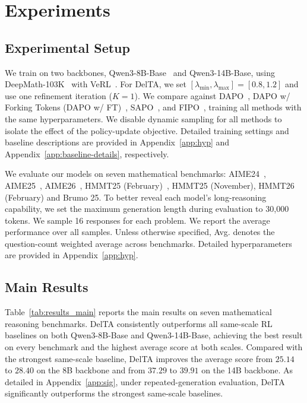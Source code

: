 \documentclass{article} %
\begin{document}
\section{Experiments}
\subsection{Experimental Setup}
\label{sec:exp_s}
We train on two backbones, Qwen3-8B-Base~\citep{yang2025qwen3} and Qwen3-14B-Base, using DeepMath-103K~\citep{he2025deepmath} with VeRL~\citep{sheng2024hybridflow}. For DelTA, we set \([\lambda_{\min},\lambda_{\max}]=[0.8,1.2]\) and use one refinement iteration (\(K=1\)). We compare against DAPO~\citep{yu2025dapo}, DAPO w/ Forking Tokens (DAPO w/ FT)~\citep{wang2025beyond}, SAPO~\citep{gao2025soft}, and FIPO~\citep{ma2026fipo}, training all methods with the same hyperparameters. We disable dynamic sampling for all methods to isolate the effect of the policy-update objective. Detailed training settings and baseline descriptions are provided in Appendix~\ref{app:hyp} and Appendix~\ref{app:baseline-details}, respectively.

We evaluate our models on seven mathematical benchmarks: AIME24~\citep{aime24}, AIME25~\citep{aime25}, AIME26~\citep{aime26}, HMMT25 (February)~\citep{balunovic_srimatharena_2025}, HMMT25 (November), HMMT26 (February) and Brumo 25.  To better reveal each model's long-reasoning capability, we set the maximum generation length during evaluation to 30{,}000 tokens. We sample 16 responses for each problem. We report the average performance over all samples. Unless otherwise specified, Avg. denotes the question-count weighted average across benchmarks. Detailed hyperparameters are provided in Appendix~\ref{app:hyp}.



\subsection{Main Results}
\label{sec:main-results}

Table~\ref{tab:results_main} reports the main results on seven mathematical
reasoning benchmarks. DelTA consistently outperforms all same-scale RL baselines
on both Qwen3-8B-Base and Qwen3-14B-Base, achieving the best result on every
benchmark and the highest average score at both scales. Compared with the
strongest same-scale baseline, DelTA improves the average score from \(25.14\)
to \(28.40\) on the 8B backbone and from \(37.29\) to \(39.91\) on the 14B
backbone. As detailed in Appendix~\ref{app:sig}, under repeated-generation evaluation, DelTA significantly outperforms the strongest same-scale baselines.
\end{document}
